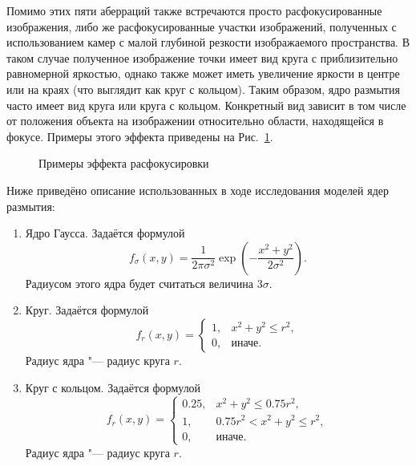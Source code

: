 Помимо этих пяти аберраций также встречаются просто расфокусированные изображения, либо же расфокусированные участки изображений, полученных с использованием камер с малой глубиной резкости изображаемого пространства. В таком случае полученное изображение точки имеет вид круга с приблизительно равномерной яркостью, однако также может иметь увеличение яркости в центре или на краях (что выглядит как круг с кольцом). Таким образом, ядро размытия часто имеет вид круга или круга с кольцом. Конкретный вид зависит в том числе от положения объекта на изображении относительно области, находящейся  в фокусе. Примеры этого эффекта приведены на Рис.~\ref{fig:warping-defocus}.

\begin{figure}[ht]
	\caption{Примеры эффекта расфокусировки}
	\label{fig:warping-defocus}
\end{figure}

Ниже приведёно описание использованных в ходе исследования моделей ядер размытия:
\begin{enumerate}[beginpenalty=10000]
	\item Ядро Гаусса.
	Задаётся формулой
	$$f_\sigma\left(x,y\right) = \frac{1}{2\pi\sigma^2}\exp\left(-\frac{x^2+y^2}{2\sigma^2}\right).$$
	Радиусом этого ядра будет считаться величина $3\sigma$.
	
	\item Круг.
	Задаётся формулой $$f_r\left(x,y\right) = \begin{cases}
		1, & x^2 + y^2 \leq r^2, \\
		0, & \text{иначе}.
	\end{cases}$$ Радиус ядра "--- радиус круга $r$.
	
	\item Круг с кольцом.
	Задаётся формулой $$f_r(x, y) = \begin{cases}
		0.25, & x^2 + y^2 \leq 0.75 r^2,\\
		1, & 0.75 r^2 < x^2 + y^2 \leq r^2,\\
		0, & \text{иначе}.
	\end{cases}$$ Радиус ядра "--- радиус круга $r$.
\end{enumerate}

